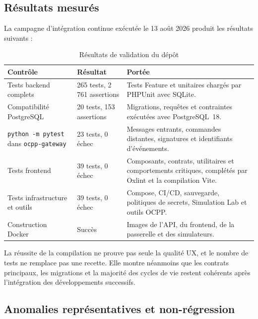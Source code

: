 \subsection{Résultats mesurés}

La campagne d'intégration continue exécutée le 13 août 2026 produit les résultats
suivants :

\begin{table}[H]
  \centering
  \caption{Résultats de validation du dépôt}
  \label{tab:implementation-test-results}
  \begin{tabularx}{\textwidth}{|p{4.5cm}|p{3.2cm}|Y|}
    \hline
    \textbf{Contrôle} & \textbf{Résultat} & \textbf{Portée}\\\hline

    Tests backend complets &
    265 tests, 2\,761 assertions & Tests Feature et unitaires chargés par
    PHPUnit avec SQLite.\\\hline
    Compatibilité PostgreSQL &
    20 tests, 153 assertions & Migrations, requêtes et contraintes exécutées
    avec PostgreSQL~18.\\\hline
    \texttt{python -m pytest} dans \texttt{ocpp-gateway} &
    23 tests, 0 échec & Messages entrants, commandes distantes, signatures et
    identifiants d'événements.\\\hline
    Tests frontend &
    39 tests, 0 échec & Composants, contrats, utilitaires et comportements
    critiques, complétés par Oxlint et la compilation Vite.\\\hline
    Tests infrastructure et outils &
    39 tests, 0 échec & Compose, CI/CD, sauvegarde, politiques de secrets,
    Simulation Lab et outils OCPP.\\\hline
    Construction Docker &
    Succès & Images de l'API, du frontend, de la passerelle et des simulateurs.\\\hline

  \end{tabularx}
\end{table}

La réussite de la compilation ne prouve pas seule la qualité UX, et le nombre de
tests ne remplace pas une recette. Elle montre néanmoins que les contrats
principaux, les migrations et la majorité des cycles de vie restent cohérents
après l'intégration des développements successifs.

\subsection{Anomalies représentatives et non-régression}

